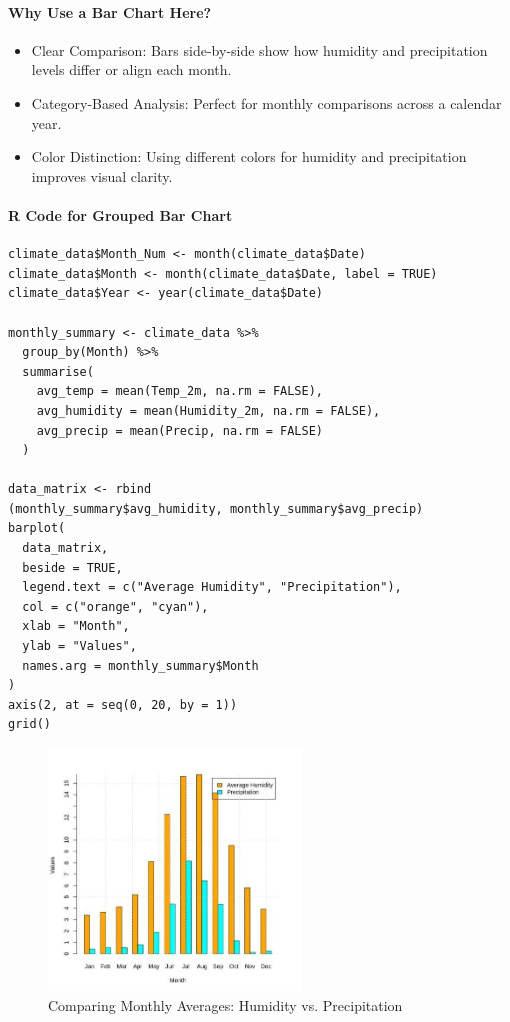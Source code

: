 \paragraph{Why Use a Bar Chart Here?}
\begin{itemize}
  \item Clear Comparison: Bars side-by-side show how humidity and precipitation levels differ or align each month.
  \item Category-Based Analysis: Perfect for monthly comparisons across a calendar year.
  \item Color Distinction: Using different colors for humidity and precipitation improves visual clarity.
\end{itemize}

\paragraph{R Code for Grouped Bar Chart}

\begin{verbatim}
climate_data$Month_Num <- month(climate_data$Date)
climate_data$Month <- month(climate_data$Date, label = TRUE)
climate_data$Year <- year(climate_data$Date)

monthly_summary <- climate_data %>%
  group_by(Month) %>%
  summarise(
    avg_temp = mean(Temp_2m, na.rm = FALSE),
    avg_humidity = mean(Humidity_2m, na.rm = FALSE),
    avg_precip = mean(Precip, na.rm = FALSE)
  )

data_matrix <- rbind
(monthly_summary$avg_humidity, monthly_summary$avg_precip)
barplot(
  data_matrix,
  beside = TRUE,
  legend.text = c("Average Humidity", "Precipitation"),
  col = c("orange", "cyan"),
  xlab = "Month",
  ylab = "Values",
  names.arg = monthly_summary$Month
)
axis(2, at = seq(0, 20, by = 1))
grid()
\end{verbatim}

\begin{figure}[h]
\centering
\includegraphics[width=0.6\textwidth]{figures/barchart3.jpg}
\caption{Comparing Monthly Averages: Humidity vs. Precipitation}
\label{fig:monthly_avg_bar}
\end{figure}

